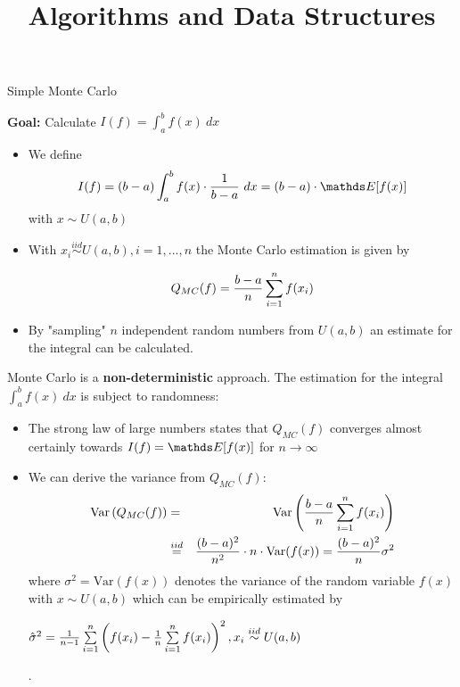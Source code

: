 \documentclass[11pt,compress,t,notes=noshow, xcolor=table]{beamer}
\title{Algorithms and Data Structures}
\begin{document}


\begin{vbframe}{Simple Monte Carlo}

\textbf{Goal:} Calculate $I(f) = \int_a^b f(x)~dx$

\begin{itemize}
\item We define
$$
I(f) = (b - a)\int_a^b f(x)\cdot \frac{1}{b - a}~dx = (b - a)\cdot \E[f(x)]
$$
with $x \sim U(a, b)$
\item With $x_i \overset{iid}{\sim} U(a, b), i = 1, ..., n$ the Monte Carlo estimation is given by

$$
Q_{MC}(f) = \frac{b - a}{n} \sum\limits_{i=1}^n f(x_i)
$$
\item By "sampling" $n$ independent random numbers from $U(a,b)$ an estimate for the integral can be calculated.
\end{itemize}

\framebreak

Monte Carlo is a \textbf{non-deterministic} approach. The estimation for the integral $\int_a^b f(x) ~dx$ is subject to randomness:

\begin{itemize}
\item The strong law of large numbers states that $Q_{MC}(f)$ converges almost certainly towards $I(f) = \E[f(x)]$ for $n\to\infty$
\item We can derive the variance from $Q_{MC}(f)$:
\vspace*{-0.2cm}
\begin{eqnarray*}
\text{Var}\left(Q_{MC}(f)\right) &=& \text{Var}\left(\frac{b - a}{n} \sum\limits_{i=1}^n f(x_i)\right) \\
&\overset{iid}{=}& \frac{(b - a)^2}{n^2}\cdot n \cdot \text{Var}(f(x)) = \frac{(b - a)^2}{n} \sigma^2
\end{eqnarray*}
where $\sigma^2 = \text{Var}(f(x))$ denotes the variance of the random variable $f(x)$ with $x \sim U(a, b)$ which can be empirically estimated by \begin{footnotesize}$\hat \sigma^2 = \frac{1}{n - 1} \sum\limits_{i=1}^n \left(f(x_i) - \frac{1}{n}\sum\limits_{i=1}^n f(x_i)\right)^2, x_i \overset{iid}{\sim} U(a, b)$\end{footnotesize}.


\end{itemize}
\end{vbframe}
\end{document}
